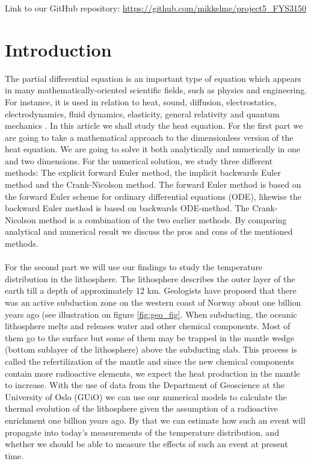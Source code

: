 \documentclass[%
 reprint,
nofootinbib,
aps,
]{revtex4-1}
\begin{document}
\vfill
\onecolumngrid
\footnotesize{{Link to our GitHub repository: \url{https://github.com/mikkelme/project5_FYS3150}}}
\twocolumngrid
\maketitle
\newpage


\section{Introduction}
The partial differential equation is an important type of equation which appears in many mathematically-oriented scientific fields, such as physics and engineering. For instance, it is used in relation to heat, sound, diffusion, electrostatics, electrodynamics, fluid dynamics, elasticity, general relativity and quantum mechanics \cite{wiki:PDE}. In this article we shall study the heat equation. For the first part we are going to take a mathematical approach to the dimensionless version of the heat equation. We are going to solve it both analytically and numerically in one and two dimensions. For the numerical solution, we study three different methods: The explicit forward Euler method, the implicit backwards Euler method and the Crank-Nicolson method. The forward Euler method is based on the forward Euler scheme for ordinary differential equations (ODE), likewise the backward Euler method is based on backwards ODE-method. The Crank-Nicolson method is a combination of the two earlier methods. By comparing analytical and numerical result we discuss the pros and cons of the mentioned methods. \\
\\
For the second part we will use our findings to study the temperature distribution in the lithosphere. The lithosphere describes the outer layer of the earth till a depth of approximately 12 km. Geologists have proposed that there was an active subduction zone on the western coast of Norway about one billion years ago (see illustration on figure \ref{fig:geo_fig}. When subducting, the oceanic lithosphere melts and releases water and other chemical components. Most of them go to the surface but some of them may be trapped in the mantle wedge (bottom sublayer of the lithosphere) above the subducting slab. This process is called the refertilization of the mantle and since the new chemical components contain more radioactive elements, we expect the heat production in the mantle to increase. With the use of data from the Department of Geoscience at the University of Oslo (GUiO) we can use our numerical models to calculate the thermal evolution of the lithosphere given the assumption of a radioactive enrichment one billion years ago. By that we can estimate how such an event will propagate into today's measurements of the temperature distribution, and whether we should be able to measure the effects of such an event at present time.
\end{document}
